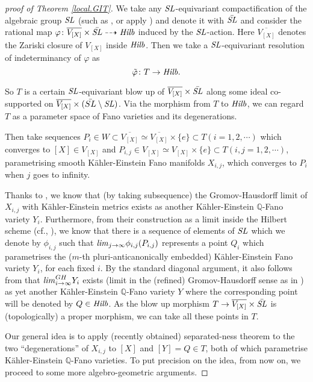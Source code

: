 \documentclass[12pt]{amsart}
\theoremstyle{remark}
\theoremstyle{definition}
\begin{document}
\begin{proof}[proof of Theorem \ref{local.GIT}]
We take any ${\it SL}$-equivariant compactification of the algebraic group 
${\it SL}$ (such as \cite{DP}, or apply \cite{Sum}) 
and denote it with $\bar{\it SL}$ and 
consider the rational map 
$\varphi\colon\overline{V_{[X]}}\times \bar{{\it SL}}\dashrightarrow 
{\it Hilb}$ induced by the ${\it SL}$-action. Here 
$\overline{V_{[X]}}$ denotes the Zariski closure of $V_{[X]}$ inside 
${\it Hilb}$. 
Then we take a 
${\it SL}$-equivariant resolution of indeterminancy of $\varphi$ 
as 
$$\tilde{\varphi}\colon T\rightarrow {\it Hilb}.$$ 

\noindent
So $T$ is a certain ${\it SL}$-equivariant blow up of 
$\overline{V_{[X]}}\times \bar{{\it SL}}$ along some ideal co-supported 
on $\overline{V_{[X]}}\times (\bar{SL}\setminus {\it SL})$. 
Via the morphism from $T$ to ${\it Hilb}$, 
we can regard $T$ as a parameter space of 
Fano varieties and its degenerations. 

Then take sequences $P_{i}\in W\subset \overline{V_{[X]}}\simeq \overline{V_{[X]}}
\times \{e\}\subset T
(i=1,2,\cdots)$ 
which converges to $[X]\in V_{[X]}$ and 
$P_{i,j} \in V_{[X]}\simeq V_{[X]}\times \{e\}\subset T ({i,j=1,2,\cdots})$, parametrising smooth K\"ahler-Einstein Fano manifolds $X_{i,j}$, which converges to 
$P_{i}$ when $j$ goes to infinity. 

Thanks to \cite{DS}, we know that (by taking subsequence) the Gromov-Hausdorff limit of 
$X_{i,j}$ with K\"ahler-Einstein metrics exists as another K\"ahler-Einstein 
$\mathbb{Q}$-Fano variety $Y_{i}$. Furthermore, from their construction as a 
limit inside the Hilbert scheme (cf., \cite[Theorem 1.2]{DS}), we know that 
there is a sequence of elements of ${\it SL}$ which we denote by 
$\phi_{i,j}$ such that ${\it lim}_{j\to \infty}\phi_{i,j}(P_{i,j})$ 
represents a point $Q_{i}$ which parametrises the 
($m$-th pluri-anticanonically embedded) K\"ahler-Einstein Fano variety $Y_{i}$, 
for each fixed $i$. By the standard diagonal argument, it also follows from 
\cite{DS} that ${\it lim}^{GH}_{i\to \infty}Y_{i}$ exists (limit in the (refined) 
Gromov-Hausdorff 
sense as in \cite{DS}) as yet another K\"ahler-Einstein $\mathbb{Q}$-Fano variety 
$Y$ where the corresponding point will be denoted by $Q\in {\it Hilb}$. 
As the blow up morphism $T\rightarrow \overline{V_{[X]}}\times \bar{{\it SL}}$ 
is (topologically) a proper morphism, we can take all these points in $T$. 

Our general idea is to apply (recently obtained) 
separated-ness theorem to the two ``degenerations'' 
of $X_{i,j}$ to $[X]$ and $[Y]=Q\in T$, both of which parametrise 
K\"ahler-Einstein $\mathbb{Q}$-Fano varieties. 
To put precision on the idea, from now on, 
we proceed to some more algebro-geometric arguments. 


\end{proof}
\end{document}
